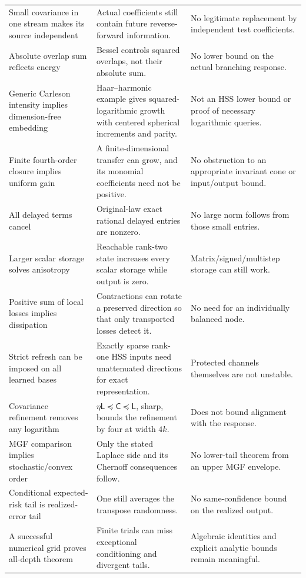 \documentclass[11pt,oneside,openany,a4paper]{book}
\numberwithin{equation}{chapter}
\theoremstyle{definition}
\theoremstyle{remark}
\newcommand{\Cov}{\mathsf C}\newcommand{\Loss}{\mathsf L}\newcommand{\Fil}{\mathcal F}
\begin{document}
\begin{longtable}{@{}>{\RaggedRight\arraybackslash}p{.29\linewidth}>{\RaggedRight\arraybackslash}p{.31\linewidth}>{\RaggedRight\arraybackslash}p{.33\linewidth}@{}}
Small covariance in one stream makes its source independent&Actual coefficients still contain future reverse-forward information.&No legitimate replacement by independent test coefficients.\\
Absolute overlap sum reflects energy&Bessel controls squared overlaps, not their absolute sum.&No lower bound on the actual branching response.\\
Generic Carleson intensity implies dimension-free embedding&Haar--harmonic example gives squared-logarithmic growth with centered spherical increments and parity.&Not an HSS lower bound or proof of necessary logarithmic queries.\\
Finite fourth-order closure implies uniform gain&A finite-dimensional transfer can grow, and its monomial coefficients need not be positive.&No obstruction to an appropriate invariant cone or input/output bound.\\
All delayed terms cancel&Original-law exact rational delayed entries are nonzero.&No large norm follows from those small entries.\\
Larger scalar storage solves anisotropy&Reachable rank-two state increases every scalar storage while output is zero.&Matrix/signed/multistep storage can still work.\\
Positive sum of local losses implies dissipation&Contractions can rotate a preserved direction so that only transported losses detect it.&No need for an individually balanced node.\\
Strict refresh can be imposed on all learned bases&Exactly sparse rank-one HSS inputs need unattenuated directions for exact representation.&Protected channels themselves are not unstable.\\
Covariance refinement removes any logarithm&$\eta\Loss\preceq\Cov\preceq\Loss$, sharp, bounds the refinement by four at width $4k$.&Does not bound alignment with the response.\\
MGF comparison implies stochastic/convex order&Only the stated Laplace side and its Chernoff consequences follow.&No lower-tail theorem from an upper MGF envelope.\\
Conditional expected-risk tail is realized-error tail&One still averages the transpose randomness.&No same-confidence bound on the realized output.\\
A successful numerical grid proves all-depth theorem&Finite trials can miss exceptional conditioning and divergent tails.&Algebraic identities and explicit analytic bounds remain meaningful.\\

\end{longtable}
\end{document}
